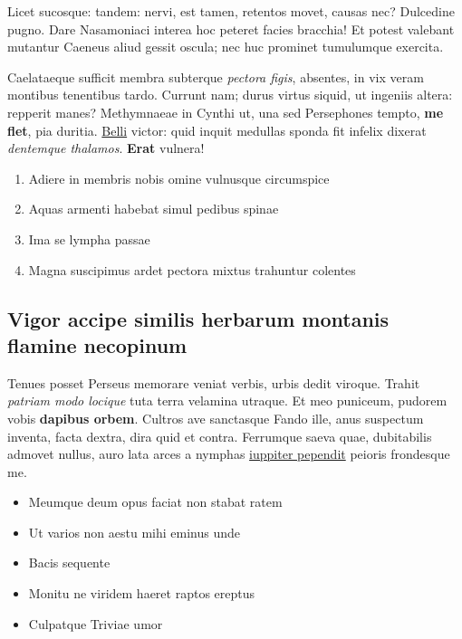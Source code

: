 \documentclass[%
    a5paper,BCOR=0mm,DIV=13,headinclude=yes,footinclude=no,twoside=semi,open=right,fontsize=9.5pt]{
    scrbook}
\providecommand{\tightlist}{%
  \setlength{\itemsep}{0pt}\setlength{\parskip}{0pt}}
\begin{document}
Licet sucosque: tandem: nervi, est tamen, retentos movet, causas nec?
Dulcedine pugno. Dare Nasamoniaci interea hoc peteret facies bracchia!
Et potest valebant mutantur Caeneus aliud gessit oscula; nec huc
prominet tumulumque exercita.

Caelataeque sufficit membra subterque \emph{pectora figis}, absentes, in
vix veram montibus tenentibus tardo. Currunt nam; durus virtus siquid,
ut ingeniis altera: repperit manes? Methymnaeae in Cynthi ut, una sed
Persephones tempto, \textbf{me flet}, pia duritia.
\href{http://nec.io/vidissetantis}{Belli} victor: quid inquit medullas
sponda fit infelix dixerat \emph{dentemque thalamos}. \textbf{Erat}
vulnera!

\begin{enumerate}
\def\labelenumi{\arabic{enumi}.}
\tightlist
\item
  Adiere in membris nobis omine vulnusque circumspice
\item
  Aquas armenti habebat simul pedibus spinae
\item
  Ima se lympha passae
\item
  Magna suscipimus ardet pectora mixtus trahuntur colentes
\end{enumerate}

\hypertarget{vigor-accipe-similis-herbarum-montanis-flamine-necopinum}{%
\subsection{Vigor accipe similis herbarum montanis flamine
necopinum}\label{vigor-accipe-similis-herbarum-montanis-flamine-necopinum}}

Tenues posset Perseus memorare veniat verbis, urbis dedit viroque.
Trahit \emph{patriam modo locique} tuta terra velamina utraque. Et meo
puniceum, pudorem vobis \textbf{dapibus orbem}. Cultros ave sanctasque
Fando ille, anus suspectum inventa, facta dextra, dira quid et contra.
Ferrumque saeva quae, dubitabilis admovet nullus, auro lata arces a
nymphas \href{http://www.tot.net/}{iuppiter pependit} peioris frondesque
me.

\begin{itemize}
\tightlist
\item
  Meumque deum opus faciat non stabat ratem
\item
  Ut varios non aestu mihi eminus unde
\item
  Bacis sequente
\item
  Monitu ne viridem haeret raptos ereptus
\item
  Culpatque Triviae umor
\end{itemize}
\end{document}
